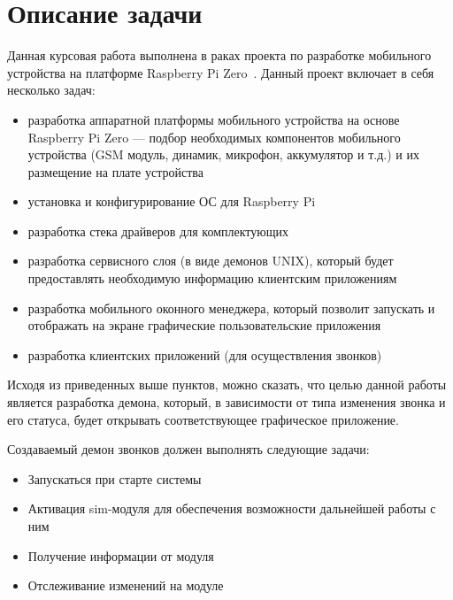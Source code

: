 \section{Описание задачи}
Данная курсовая работа выполнена в раках проекта по разработке мобильного устройства  на платформе Raspberry Pi Zero~\cite{RPiZero}. Данный проект включает в себя несколько задач:
\begin{itemize}
\item разработка аппаратной платформы мобильного устройства на основе Raspberry Pi Zero --- подбор необходимых компонентов мобильного устройства (GSM модуль, динамик, микрофон, аккумулятор и т.д.) и их размещение на плате устройства
\item установка и конфигурирование ОС для Raspberry Pi
\item разработка стека драйверов для комплектующих
\item разработка сервисного слоя (в виде демонов UNIX), который будет предоставлять необходимую информацию клиентским приложениям
\item разработка мобильного оконного менеджера, который позволит запускать и отображать на экране графические пользовательские приложения
\item разработка клиентских приложений (для осуществления звонков)
\end{itemize}

Исходя из приведенных выше пунктов, можно сказать, что целью данной работы является разработка демона, который, в зависимости от типа изменения звонка и его статуса, будет открывать соответствующее графическое приложение. 

Создаваемый демон звонков должен выполнять следующие задачи:
\begin{itemize}
\item Запускаться при старте системы
\item Активация sim-модуля для обеспечения возможности дальнейшей работы с ним
\item Получение информации от модуля
\item Отслеживание изменений на модуле
\end{itemize}
